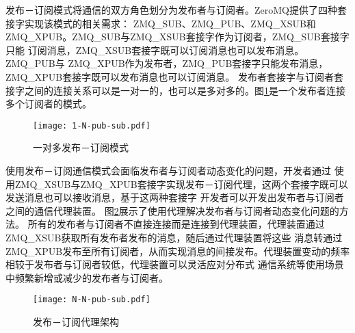 发布－订阅模式将通信的双方角色划分为发布者与订阅者。ZeroMQ提供了四种套接字实现该模式的相关需求：
ZMQ\_SUB、ZMQ\_PUB、ZMQ\_XSUB和ZMQ\_XPUB。ZMQ\_SUB与ZMQ\_XSUB套接字作为订阅者，ZMQ\_SUB套接字只能
订阅消息，ZMQ\_XSUB套接字既可以订阅消息也可以发布消息。ZMQ\_PUB与
ZMQ\_XPUB作为发布者，ZMQ\_PUB套接字只能发布消息，ZMQ\_XPUB套接字既可以发布消息也可以订阅消息。
发布者套接字与订阅者套接字之间的连接关系可以是一对一的，也可以是多对多的。图\ref{1-N-pub-sub}是一个发布者连接多个订阅者的模式。
\begin{figure}[H]
  \centering
  \texttt{[image: 1-N-pub-sub.pdf]}
  \caption{一对多发布－订阅模式}
  \label{1-N-pub-sub}
\end{figure}

使用发布－订阅通信模式会面临发布者与订阅者动态变化的问题，开发者通过
使用ZMQ\_XSUB与ZMQ\_XPUB套接字实现发布－订阅代理，这两个套接字既可以发送消息也可以接收消息，基于这两种套接字
开发者可以开发出发布者与订阅者之间的通信代理装置。
图\ref{N-N-pub-sub}展示了使用代理解决发布者与订阅者动态变化问题的方法。
所有的发布者与订阅者不直接连接而是连接到代理装置，代理装置通过ZMQ\_XSUB获取所有发布者发布的消息，随后通过代理装置将这些
消息转通过ZMQ\_XPUB发布至所有订阅者，从而实现消息的间接发布。代理装置变动的频率相较于发布者与订阅者较低，代理装置可以灵活应对分布式
通信系统等使用场景中频繁新增或减少的发布者与订阅者。
\begin{figure}[H]
  \centering
  \texttt{[image: N-N-pub-sub.pdf]}
  \caption{发布－订阅代理架构}
  \label{N-N-pub-sub}
\end{figure}

